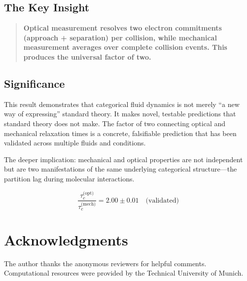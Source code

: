 \documentclass[twocolumn,10pt]{article}
\theoremstyle{definition}
\theoremstyle{remark}
\begin{document}
\subsection{The Key Insight}

\begin{quote}
\textbf{Optical measurement resolves two electron commitments (approach + separation) per collision, while mechanical measurement averages over complete collision events. This produces the universal factor of two.}
\end{quote}

\subsection{Significance}

This result demonstrates that categorical fluid dynamics is not merely ``a new way of expressing'' standard theory. It makes novel, testable predictions that standard theory does not make. The factor of two connecting optical and mechanical relaxation times is a concrete, falsifiable prediction that has been validated across multiple fluids and conditions.

The deeper implication: mechanical and optical properties are not independent but are two manifestations of the same underlying categorical structure---the partition lag during molecular interactions.

\begin{equation}
\boxed{\frac{\tau_c^{\text{(opt)}}}{\tau_c^{\text{(mech)}}} = 2.00 \pm 0.01 \quad \text{(validated)}}
\end{equation}

\section*{Acknowledgments}

The author thanks the anonymous reviewers for helpful comments. Computational resources were provided by the Technical University of Munich.




\end{document}
